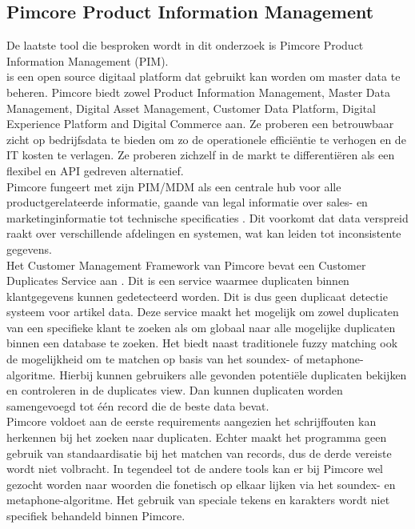 \subsection{Pimcore Product Information Management}
De laatste tool die besproken wordt in dit onderzoek is Pimcore Product Information Management (PIM). 
\\ \textcite{Pimcore} is een open source digitaal platform dat gebruikt kan worden om master data te beheren. Pimcore biedt zowel Product Information Management, Master Data Management, Digital Asset Management, Customer Data Platform, Digital Experience Platform and Digital Commerce aan. Ze proberen een betrouwbaar zicht op bedrijfsdata te bieden om zo de operationele efficiëntie te verhogen en de IT kosten te verlagen. Ze proberen zichzelf in de markt te differentiëren als een flexibel en API gedreven alternatief. 
\\Pimcore fungeert met zijn PIM/MDM als een centrale hub voor alle productgerelateerde informatie, gaande van legal informatie over sales- en marketinginformatie tot technische specificaties \autocite{StudioEmma}. Dit voorkomt dat data verspreid raakt over verschillende afdelingen en systemen, wat kan leiden tot inconsistente gegevens.
\\Het Customer Management Framework van Pimcore bevat een Customer Duplicates Service aan \autocite{Pimcore2024}. Dit is een service waarmee duplicaten binnen klantgegevens kunnen gedetecteerd worden. Dit is dus geen duplicaat detectie systeem voor artikel data. Deze service maakt het mogelijk om zowel duplicaten van een specifieke klant te zoeken als om globaal naar alle mogelijke duplicaten binnen een database te zoeken. Het biedt naast traditionele fuzzy matching ook de mogelijkheid om te matchen op basis van het soundex- of metaphone-algoritme. Hierbij kunnen gebruikers alle gevonden potentiële duplicaten bekijken en controleren in de duplicates view. Dan kunnen duplicaten worden samengevoegd tot één record die de beste data bevat.
\\Pimcore voldoet aan de eerste requirements aangezien het schrijffouten kan herkennen bij het zoeken naar duplicaten. Echter maakt het programma geen gebruik van standaardisatie bij het matchen van records, dus de derde vereiste wordt niet volbracht. In tegendeel tot de andere tools kan er bij Pimcore wel gezocht worden naar woorden die fonetisch op elkaar lijken via het soundex- en metaphone-algoritme. Het gebruik van speciale tekens en karakters wordt niet specifiek behandeld binnen Pimcore.
